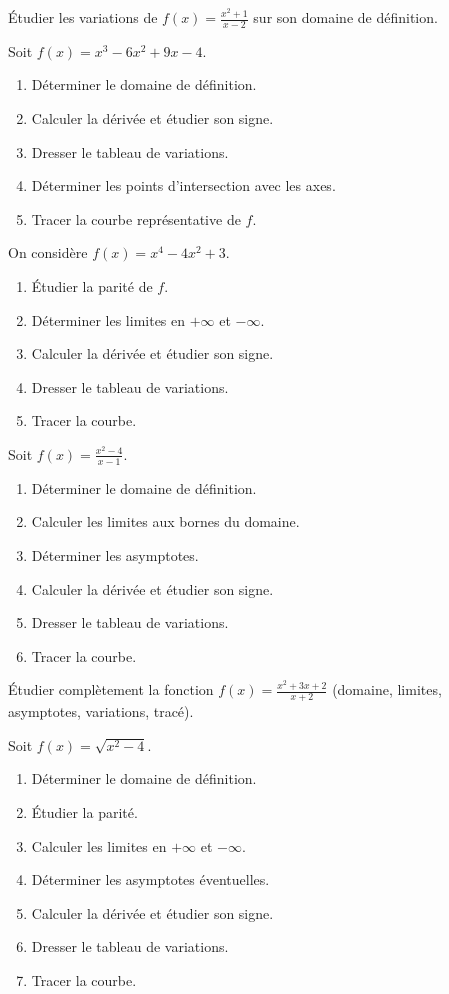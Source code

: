 \exo{}
Étudier les variations de \(f(x)=\frac{x^2+1}{x-2}\) sur son domaine de définition.


\exo{}
Soit \(f(x)=x^3-6x^2+9x-4\).
\begin{enumerate}[label=\alph*)]
\item Déterminer le domaine de définition.
\item Calculer la dérivée et étudier son signe.
\item Dresser le tableau de variations.
\item Déterminer les points d'intersection avec les axes.
\item Tracer la courbe représentative de \(f\).
\end{enumerate}

\exo{}
On considère \(f(x)=x^4-4x^2+3\).
\begin{enumerate}[label=\alph*)]
\item Étudier la parité de \(f\).
\item Déterminer les limites en \(+\infty\) et \(-\infty\).
\item Calculer la dérivée et étudier son signe.
\item Dresser le tableau de variations.
\item Tracer la courbe.
\end{enumerate}


\exo{}
Soit \(f(x)=\frac{x^2-4}{x-1}\).
\begin{enumerate}[label=\alph*)]
\item Déterminer le domaine de définition.
\item Calculer les limites aux bornes du domaine.
\item Déterminer les asymptotes.
\item Calculer la dérivée et étudier son signe.
\item Dresser le tableau de variations.
\item Tracer la courbe.
\end{enumerate}

\exo{}
Étudier complètement la fonction \(f(x)=\frac{x^2+3x+2}{x+2}\) (domaine, limites, asymptotes, variations, tracé).


\exo{}
Soit \(f(x)=\sqrt{x^2-4}\).
\begin{enumerate}[label=\alph*)]
\item Déterminer le domaine de définition.
\item Étudier la parité.
\item Calculer les limites en \(+\infty\) et \(-\infty\).
\item Déterminer les asymptotes éventuelles.
\item Calculer la dérivée et étudier son signe.
\item Dresser le tableau de variations.
\item Tracer la courbe.
\end{enumerate}

